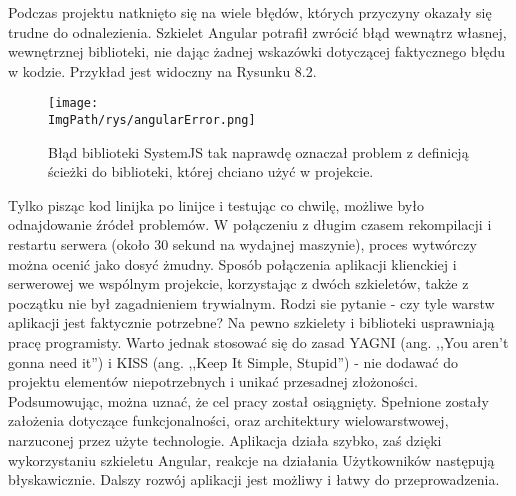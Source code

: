 \documentclass[a4paper,12pt,twoside,openany]{report}
\newcommand{\ImgPath}{.}
\begin{document}
Podczas projektu natknięto się na wiele błędów, których przyczyny okazały się trudne do odnalezienia. Szkielet Angular potrafił zwrócić błąd wewnątrz własnej, wewnętrznej biblioteki, nie dając żadnej wskazówki dotyczącej faktycznego błędu w kodzie. Przykład jest widoczny na Rysunku 8.2.
				\begin{sidewaysfigure}[!htbp]
					\begin{center}
						\centering
						\texttt{[image: \\ImgPath/rys/angularError.png]}
					\end{center}
					\caption{Błąd biblioteki SystemJS tak naprawdę oznaczał problem z definicją ścieżki do biblioteki, której chciano użyć w projekcie.}
					\label{UMLTS}
				\end{sidewaysfigure}
Tylko pisząc kod linijka po linijce i testując co chwilę, możliwe było odnajdowanie źródeł problemów. W połączeniu z długim czasem rekompilacji i restartu serwera (około 30 sekund na wydajnej maszynie), proces wytwórczy można ocenić jako dosyć żmudny. Sposób połączenia aplikacji klienckiej i serwerowej we wspólnym projekcie, korzystając z dwóch szkieletów, także z początku nie był zagadnieniem trywialnym. Rodzi sie pytanie - czy tyle warstw aplikacji jest faktycznie potrzebne? Na pewno szkielety i biblioteki usprawniają pracę programisty. Warto jednak stosować się do zasad YAGNI (ang. ,,You aren't gonna need it'') i KISS (ang. ,,Keep It Simple, Stupid'') - nie dodawać do projektu elementów niepotrzebnych i unikać przesadnej złożoności.\\

Podsumowując, można uznać, że cel pracy został osiągnięty. Spełnione zostały założenia dotyczące funkcjonalności, oraz architektury wielowarstwowej, narzuconej przez użyte technologie. Aplikacja działa szybko, zaś dzięki wykorzystaniu szkieletu Angular, reakcje na działania Użytkowników następują błyskawicznie. Dalszy rozwój aplikacji jest możliwy i łatwy do przeprowadzenia.
\end{document}
